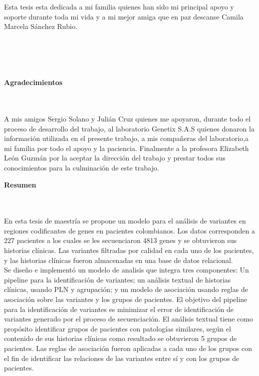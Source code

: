 \begin{flushright}
\begin{minipage}{8cm}
    \noindent
        Esta tesis esta dedicada a mi familia quienes han sido mi principal apoyo y soporte durante toda mi vida y a mi mejor amiga que en paz descanse Camila Marcela Sánchez Rubio.\\[1.0cm]\\
      \end{minipage}
\end{flushright}

\newpage{\pagestyle{empty}\cleardoublepage}

\newpage
\thispagestyle{empty} \textbf{}\normalsize
\\\\\\%
\textbf{\LARGE Agradecimientos}
\\\\
A mis amigos Sergio Solano y Julián Cruz quienes me apoyaron, durante todo el proceso de desarrollo del trabajo, al laboratorio Genetix S.A.S quienes donaron la información utilizada en el presente trabajo, a mis compañeras del laboratorio,a mi familia por todo el apoyo y la paciencia. Finalmente a la profesora Elizabeth León Guzmán por la aceptar la dirección del trabajo y prestar todos sus conocimientos para la culminación de este trabajo. \\

\newpage{\pagestyle{empty}\cleardoublepage}

\newpage
\textbf{\LARGE Resumen}
\\\\
En esta tesis de maestría se propone un modelo para el análisis de variantes en regiones codificantes de genes en pacientes colombianos. Los datos corresponden a 227 pacientes a los cuales se les secuenciaron 4813 genes y se obtuvieron sus historias clínicas. Las variantes filtradas por calidad en cada uno de los pacientes, y las historias clínicas fueron almacenadas en una base de datos relacional.\\

Se diseño e implementó un modelo de analisis que integra tres componentes: Un pipeline para la identificación de variantes; un análisis textual de historias clínicas, usando PLN y agrupación; y un modelo de asociación usando reglas de asociación sobre las variantes y los grupos de pacientes. El objetivo del pipeline para la identificación de variantes es minimizar el error de identificación de variantes generado por el proceso de secuenciación. El análisis textual tiene como propósito identificar grupos de pacientes con patologías similares, según el contenido de sus historias clínicas como resultado se obtuvieron 5 grupos de pacientes. Las reglas de asociación fueron aplicadas a cada uno de los grupos con el fin de identificar las relaciones de las variantes entre sí y con los grupos de pacientes.  \\

